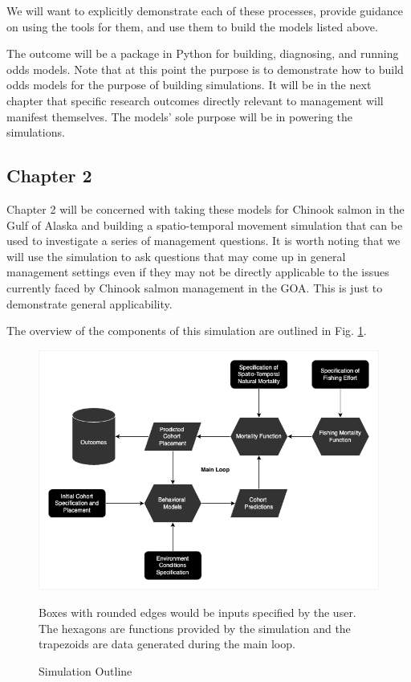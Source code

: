 \documentclass[11pt]{article}
\begin{document}
We will want to explicitly demonstrate each of these processes, provide guidance on using the tools for them, and use them to build the models listed above. \newline

The outcome will be a package in Python for building, diagnosing, and running odds models. Note that at this point the purpose is to demonstrate how to build odds models for the purpose of building simulations. It will be in the next chapter that specific research outcomes directly relevant to management will manifest themselves. The models' sole purpose will be in powering the simulations. 

\subsection{Chapter 2}

Chapter 2 will be concerned with taking these models for Chinook salmon in the Gulf of Alaska and building a spatio-temporal movement simulation that can be used to investigate a series of management questions. It is worth noting that we will use the simulation to ask questions that may come up in general management settings even if they may not be directly applicable to the issues currently faced by Chinook salmon management in the GOA. This is just to demonstrate general applicability. \newline

The overview of the components of this simulation are outlined in Fig. \ref{fig:simulation}. 

\begin{figure}[h!] 
  \includegraphics[width=\linewidth]{simulation.png}
  \caption{Simulation Outline}
  \medskip
	\small
	Boxes with rounded edges would be inputs specified by the user. The hexagons are functions 		provided by the simulation and the trapezoids are data generated during the main loop. 
  \label{fig:simulation}
\end{figure}
\end{document}
